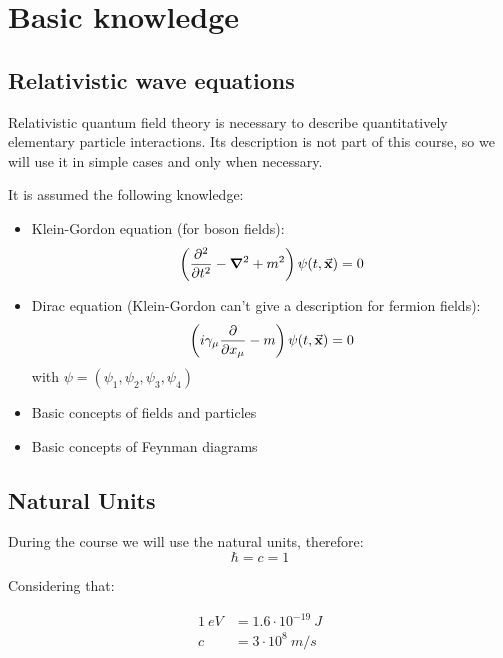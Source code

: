 \documentclass[../../main/main.tex]{subfiles}
\begin{document}
\section{Basic knowledge}

\subsection*{Relativistic wave equations}
Relativistic quantum field theory is necessary to describe quantitatively elementary particle interactions. Its description is not part of this course, so we will use it in simple cases and only when necessary.

It is assumed the following knowledge:
\begin{itemize}
    \item Klein-Gordon equation (for boson fields):
        \begin{equation}
            \left( \pdv[2]{}{t} - \grad^2 + m^2 \right) \psi (t, \va{x} ) = 0
            \label{eq:L01_KGE}
        \end{equation}

    \item Dirac equation (Klein-Gordon can't give a description for fermion fields):
        \begin{equation}
            \left( i \gamma_{\mu} \pdv{}{x_{\mu}} - m \right) \psi (t, \va{x} ) = 0
            \label{eq:L01_DE}
        \end{equation}
        with \( \psi = (\psi_1, \psi_2, \psi_3, \psi_4) \)

    \item Basic concepts of fields and particles
    \item Basic concepts of Feynman diagrams
\end{itemize}





\subsection*{Natural Units}
During the course we will use the natural units, therefore:
\begin{equation}
    \hbar = c = 1
    \label{eq:L01_NU}
\end{equation}

Considering that:

\begin{align*}
    1 \ \si{eV} &= 1.6 \cdot 10^{-19} \ \si{J} \\
    c &= 3 \cdot 10^8 \ \si{m/s}
\end{align*}
\end{document}
